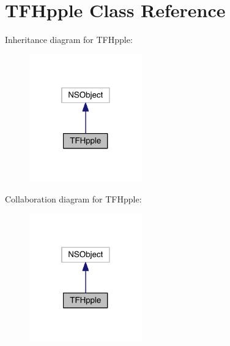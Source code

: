 \section{T\+F\+Hpple Class Reference}
\label{interface_t_f_hpple}


Inheritance diagram for T\+F\+Hpple\+:
\nopagebreak
\begin{figure}[H]
\begin{center}
\leavevmode
\includegraphics[width=138pt]{interface_t_f_hpple__inherit__graph}
\end{center}
\end{figure}


Collaboration diagram for T\+F\+Hpple\+:
\nopagebreak
\begin{figure}[H]
\begin{center}
\leavevmode
\includegraphics[width=138pt]{interface_t_f_hpple__coll__graph}
\end{center}
\end{figure}
